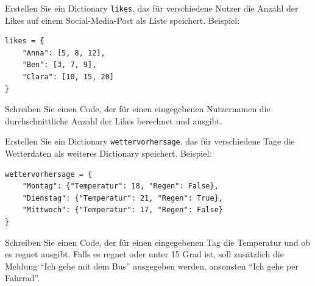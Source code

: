 \begin{myexercise}
	Erstellen Sie ein Dictionary \lstinline|likes|, das für verschiedene Nutzer die Anzahl der Likes auf einem Social-Media-Post als Liste speichert. Beispiel:
	\begin{lstlisting}
likes = {
	"Anna": [5, 8, 12],
	"Ben": [3, 7, 9],
	"Clara": [10, 15, 20]
}
\end{lstlisting}
	Schreiben Sie einen Code, der für einen eingegebenen Nutzernamen die durchschnittliche Anzahl der Likes berechnet und ausgibt.
	\begin{myanswer}
		
	\end{myanswer}
\end{myexercise}

\begin{myexercise}
	Erstellen Sie ein Dictionary \lstinline|wettervorhersage|, das für verschiedene Tage die Wetterdaten als weiteres Dictionary speichert. Beispiel:
	\begin{lstlisting}
wettervorhersage = {
	"Montag": {"Temperatur": 18, "Regen": False},
	"Dienstag": {"Temperatur": 21, "Regen": True},
	"Mittwoch": {"Temperatur": 17, "Regen": False}
}
\end{lstlisting}
	Schreiben Sie einen Code, der für einen eingegebenen Tag die Temperatur und ob es regnet ausgibt. Falls es regnet oder unter 15 Grad ist, soll zusätzlich die Meldung \enquote{Ich gehe mit dem Bus} ausgegeben werden, ansonsten \enquote{Ich gehe per Fahrrad}.
	\begin{myanswer}
		
	\end{myanswer}
\end{myexercise}


